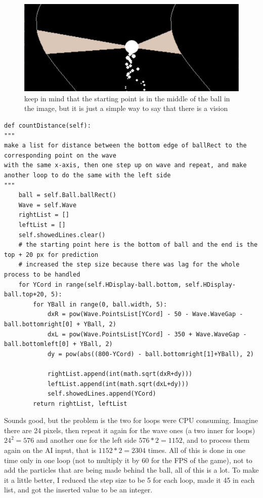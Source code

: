 \begin{figure}[H]
	\centering
	\includegraphics[width=0.7\linewidth]{"usedImages/vision 576 lines"}
	\caption{keep in mind that the starting point is in the middle of the ball in the image, but it is just a simple way to say that there is a vision}
	\label{fig:vision-576-lines}
\end{figure}

\begin{listing}
	\begin{verbatim}
def countDistance(self):
"""
make a list for distance between the bottom edge of ballRect to the corresponding point on the wave 
with the same x-axis, then one step up on wave and repeat, and make another loop to do the same with the left side
"""
	ball = self.Ball.ballRect()
	Wave = self.Wave
	rightList = []
	leftList = []
	self.showedLines.clear()
	# the starting point here is the bottom of ball and the end is the top + 20 px for prediction
	# increased the step size because there was lag for the whole process to be handled
	for YCord in range(self.HDisplay-ball.bottom, self.HDisplay-ball.top+20, 5):
		for YBall in range(0, ball.width, 5):
			dxR = pow(Wave.PointsList[YCord] - 50 - Wave.WaveGap - ball.bottomright[0] + YBall, 2)
			dxL = pow(Wave.PointsList[YCord] - 350 + Wave.WaveGap - ball.bottomleft[0] + YBall, 2)
			dy = pow(abs((800-YCord) - ball.bottomright[1]+YBall), 2)

			rightList.append(int(math.sqrt(dxR+dy)))
			leftList.append(int(math.sqrt(dxL+dy)))
			self.showedLines.append(YCord)
		return rightList, leftList
	\end{verbatim}
\end{listing}

Sounds good, but the problem is the two for loops were CPU consuming. Imagine there are 24 pixels, then repeat it again for the wave ones (a two inner for loops) $24^2 = 576$ and another one for the left side $576*2 = 1152$, and to process them again on the AI input, that is $1152*2 = 2304$ times. All of this is done in one time only in one  loop (not to multiply it by 60 for the FPS of the game), not to add the particles that are being made behind the ball, all of this is a lot. To make it a little better, I reduced the step size to be 5 for each loop, made it 45 in each list, and got the inserted value to be an integer.

